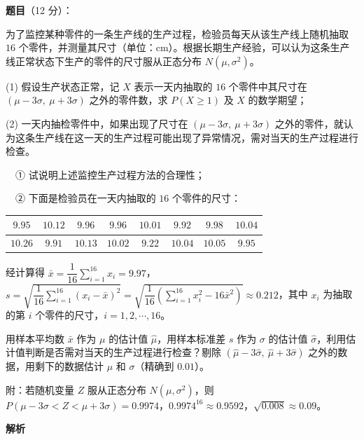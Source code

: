 \begin{answer}

\textbf{题目}（12 分）：

为了监控某种零件的一条生产线的生产过程，检验员每天从该生产线上随机抽取 $16$ 个零件，并测量其尺寸（单位：$\mathrm{cm}$）。根据长期生产经验，可以认为这条生产线正常状态下生产的零件的尺寸服从正态分布 $N\left(\mu,\sigma^{2}\right)$。

  (1) 假设生产状态正常，记 $X$ 表示一天内抽取的 $16$ 个零件中其尺寸在 $(\mu-3\sigma,\ \mu+3\sigma)$ 之外的零件数，求 $P(X\ge1)$ 及 $X$ 的数学期望；

  (2) 一天内抽检零件中，如果出现了尺寸在 $(\mu-3\sigma,\ \mu+3\sigma)$ 之外的零件，就认为这条生产线在这一天的生产过程可能出现了异常情况，需对当天的生产过程进行检查。

  　① 试说明上述监控生产过程方法的合理性；

  　② 下面是检验员在一天内抽取的 $16$ 个零件的尺寸：

\begin{center}
\begingroup\setlength{\tabcolsep}{4pt}
\begin{tabular}{cccccccc}
\toprule
$9.95$ & $10.12$ & $9.96$ & $9.96$ & $10.01$ & $9.92$ & $9.98$ & $10.04$ \\
\midrule
$10.26$ & $9.91$ & $10.13$ & $10.02$ & $9.22$ & $10.04$ & $10.05$ & $9.95$ \\
\bottomrule
\end{tabular}
\endgroup
\end{center}

  经计算得 $\bar x=\dfrac1{16}\sum\limits_{i=1}^{16}x_i=9.97$，$s=\sqrt{\dfrac1{16}\sum\limits_{i=1}^{16}\left(x_i-\bar x\right)^{2}}=\sqrt{\dfrac1{16}\left(\sum\limits_{i=1}^{16}x_i^{2}-16\bar x^{2}\right)}\approx0.212$，其中 $x_i$ 为抽取的第 $i$ 个零件的尺寸，$i=1,2,\cdots,16$。

  用样本平均数 $\bar x$ 作为 $\mu$ 的估计值 $\hat\mu$，用样本标准差 $s$ 作为 $\sigma$ 的估计值 $\hat\sigma$，利用估计值判断是否需对当天的生产过程进行检查？剔除 $\left(\hat\mu-3\hat\sigma,\ \hat\mu+3\hat\sigma\right)$ 之外的数据，用剩下的数据估计 $\mu$ 和 $\sigma$（精确到 $0.01$）。

  附：若随机变量 $Z$ 服从正态分布 $N\left(\mu,\sigma^{2}\right)$，则 $P(\mu-3\sigma<Z<\mu+3\sigma)=0.9974$，$0.9974^{16}\approx0.9592$，$\sqrt{0.008}\approx0.09$。

\textbf{解析}



\end{answer}
